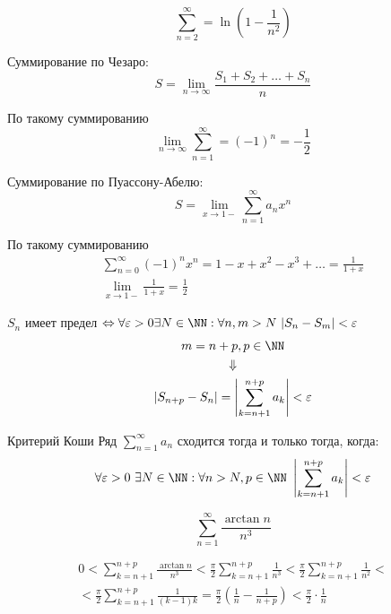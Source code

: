 \begin{example}{}{}
    \[
        \sum\limits_{n = 2}^{\infty} = \ln \left( 1 - \frac{1}{n^2} \right)
    \]
\end{example}

Суммирование по Чезаро:
\[
    S = \lim\limits_{n \to \infty} \frac{S_1 + S_2 + \ldots + S_n}{n}
\]

По такому суммированию
\[
    \lim\limits_{n \to \infty} \sum\limits_{n = 1}^{\infty} = (-1)^n = -\frac{1}{2}
\]

Суммирование по Пуассону-Абелю:
\[
    S = \lim\limits_{x \to 1-} \sum\limits_{n = 1}^{\infty} a_n x^n
\]

По такому суммированию
\begin{gather*}
    \sum\limits_{n = 0}^{\infty} (-1)^n x^n = 1 - x + x^2 - x^3 + \ldots = \frac{1}{1 + x}
    \\
    \lim\limits_{x \to 1-} \frac{1}{1 + x} = \frac{1}{2}
\end{gather*}

\( S_n \) имеет предел \( \Leftrightarrow \forall \varepsilon > 0 \exists N \in \NN : \forall n, m > N \ | S_n - S_m | < \varepsilon \)
\begin{gather*}
    m = n + p, p \in \NN
    \\
    \Downarrow
    \\
    | S_{n + p} - S_n | = \left| \sum\limits_{k = n + 1}^{n + p} a_k \right| < \varepsilon
\end{gather*}

\begin{thrm}{Критерий Коши}{}
    Ряд \( \sum\limits_{n = 1}^{\infty} a_n \) сходится
    тогда и только тогда, когда: 
    \[ 
        \forall \varepsilon > 0 \ \exists N \in \NN : \forall n > N, p \in \NN \ 
        \left| \sum\limits_{k = n + 1}^{n + p} a_k \right| < \varepsilon
    \]
\end{thrm}

\newpage

\begin{example}{}{}
    \[
        \sum\limits_{n = 1}^{\infty} \frac{\arctan n}{n^3}
    \]
\end{example}

\begin{gather*}
    0 < \sum\limits_{k = n + 1}^{n + p} \frac{\arctan n}{n^3} 
        < \frac{\pi}{2} \sum\limits_{k = n + 1}^{n + p} \frac{1}{n^3}
        < \frac{\pi}{2} \sum\limits_{k = n + 1}^{n + p} \frac{1}{n^2}
        <
    \\
    < \frac{\pi}{2} \sum\limits_{k = n + 1}^{n + p} \frac{1}{(k - 1)k}
        = \frac{\pi}{2} \left( \frac{1}{n} - \frac{1}{n + p} \right)
        < \frac{\pi}{2} \cdot \frac{1}{n}
\end{gather*}

